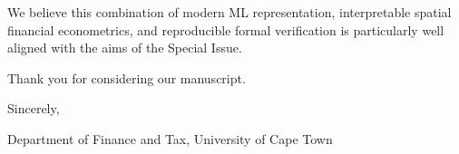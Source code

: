 \documentclass[11pt]{article}
\begin{document}
We believe this combination of modern ML representation, interpretable
spatial financial econometrics, and reproducible formal verification is
particularly well aligned with the aims of the Special Issue.

Thank you for considering our manuscript.

\begingroup
\setlength{\parskip}{0pt}
Sincerely,\par
\smallskip
\paperauthorone\par
Department of Finance and Tax, University of Cape Town\par
\href{mailto:\paperemail}{\paperemail}
\endgroup
\end{document}
